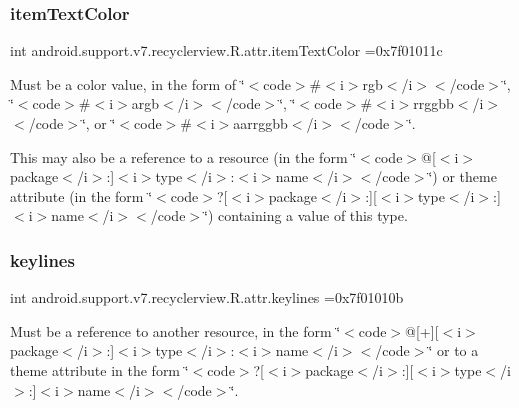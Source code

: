 \subsubsection{\texorpdfstring{item\+Text\+Color}{itemTextColor}}
{\footnotesize\ttfamily int android.\+support.\+v7.\+recyclerview.\+R.\+attr.\+item\+Text\+Color =0x7f01011c\hspace{0.3cm}{\ttfamily [static]}}

Must be a color value, in the form of \char`\"{}$<$code$>$\#$<$i$>$rgb$<$/i$>$$<$/code$>$\char`\"{}, \char`\"{}$<$code$>$\#$<$i$>$argb$<$/i$>$$<$/code$>$\char`\"{}, \char`\"{}$<$code$>$\#$<$i$>$rrggbb$<$/i$>$$<$/code$>$\char`\"{}, or \char`\"{}$<$code$>$\#$<$i$>$aarrggbb$<$/i$>$$<$/code$>$\char`\"{}. 

This may also be a reference to a resource (in the form \char`\"{}$<$code$>$@\mbox{[}$<$i$>$package$<$/i$>$\+:\mbox{]}$<$i$>$type$<$/i$>$\+:$<$i$>$name$<$/i$>$$<$/code$>$\char`\"{}) or theme attribute (in the form \char`\"{}$<$code$>$?\mbox{[}$<$i$>$package$<$/i$>$\+:\mbox{]}\mbox{[}$<$i$>$type$<$/i$>$\+:\mbox{]}$<$i$>$name$<$/i$>$$<$/code$>$\char`\"{}) containing a value of this type. \mbox{\label{classandroid_1_1support_1_1v7_1_1recyclerview_1_1R_1_1attr_a9d53a7bf6fc45091cced26952145f745}} 
\subsubsection{\texorpdfstring{keylines}{keylines}}
{\footnotesize\ttfamily int android.\+support.\+v7.\+recyclerview.\+R.\+attr.\+keylines =0x7f01010b\hspace{0.3cm}{\ttfamily [static]}}

Must be a reference to another resource, in the form \char`\"{}$<$code$>$@\mbox{[}+\mbox{]}\mbox{[}$<$i$>$package$<$/i$>$\+:\mbox{]}$<$i$>$type$<$/i$>$\+:$<$i$>$name$<$/i$>$$<$/code$>$\char`\"{} or to a theme attribute in the form \char`\"{}$<$code$>$?\mbox{[}$<$i$>$package$<$/i$>$\+:\mbox{]}\mbox{[}$<$i$>$type$<$/i$>$\+:\mbox{]}$<$i$>$name$<$/i$>$$<$/code$>$\char`\"{}. \mbox{\label{classandroid_1_1support_1_1v7_1_1recyclerview_1_1R_1_1attr_a4a8740f70c774b8ab6210012211a12df}} 
